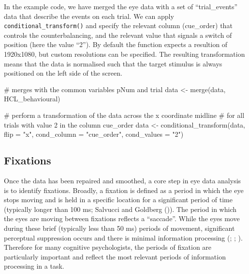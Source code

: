 \documentclass[
  man,
  floatsintext,
  longtable,
  nolmodern,
  notxfonts,
  notimes,
  colorlinks=true,linkcolor=blue,citecolor=blue,urlcolor=blue]{apa7}
\newenvironment{Shaded}{\begin{snugshade}}{\end{snugshade}}
\newcommand{\AttributeTok}[1]{\textcolor[rgb]{0.40,0.45,0.13}{#1}}
\newcommand{\CommentTok}[1]{\textcolor[rgb]{0.37,0.37,0.37}{#1}}
\newcommand{\FunctionTok}[1]{\textcolor[rgb]{0.28,0.35,0.67}{#1}}
\newcommand{\NormalTok}[1]{\textcolor[rgb]{0.00,0.23,0.31}{#1}}
\newcommand{\OtherTok}[1]{\textcolor[rgb]{0.00,0.23,0.31}{#1}}
\newcommand{\StringTok}[1]{\textcolor[rgb]{0.13,0.47,0.30}{#1}}
\begin{document}
In the example code, we have merged the eye data with a set of
``trial\_events'' data that describe the events on each trial. We can
apply \texttt{conditional\_transform()} and specify the relevant column
(cue\_order) that controls the counterbalancing, and the relevant value
that signals a switch of position (here the value ``2''). By default the
function expects a resultion of 1920x1080, but custom resolutions can be
specified. The resulting transformation means that the data is
normalised such that the target stimulus is always positioned on the
left side of the screen.

\begin{Shaded}
\begin{Highlighting}[]
\CommentTok{\# merges with the common variables pNum and trial}
\NormalTok{data }\OtherTok{\textless{}{-}} \FunctionTok{merge}\NormalTok{(data, HCL\_behavioural) }

\CommentTok{\# perform a transformation of the data across the x coordinate midline}
\CommentTok{\# for all trials with value 2 in the column cue\_order}
\NormalTok{data }\OtherTok{\textless{}{-}} \FunctionTok{conditional\_transform}\NormalTok{(data, }
                              \AttributeTok{flip =} \StringTok{"x"}\NormalTok{, }
                              \AttributeTok{cond\_column =} \StringTok{"cue\_order"}\NormalTok{, }
                              \AttributeTok{cond\_values =} \StringTok{"2"}\NormalTok{) }
\end{Highlighting}
\end{Shaded}

\subsection{Fixations}\label{fixations}

Once the data has been repaired and smoothed, a core step in eye data
analysis is to identify fixations. Broadly, a fixation is defined as a
period in which the eye stops moving and is held in a specific location
for a significant period of time (typically longer than 100 ms; Salvucci
and Goldberg ()). The period in which
the eyes are moving between fixations reflects a ``saccade''. While the
eyes move during these brief (typically less than 50 ms) periods of
movement, significant perceptual suppression occurs and there is minimal
information processing (; ;
). Therefore for
many cognitive psychologists, the periods of fixation are particularly
important and reflect the most relevant periods of information
processing in a task.
\end{document}
